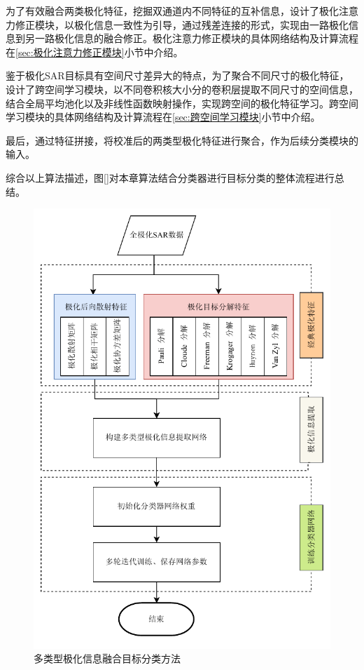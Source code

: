 为了有效融合两类极化特征，挖掘双通道内不同特征的互补信息，设计了极化注意力修正模块，以极化信息一致性为引导，通过残差连接的形式，实现由一路极化信息到另一路极化信息的融合修正。极化注意力修正模块的具体网络结构及计算流程在\ref{sec:极化注意力修正模块}小节中介绍。

鉴于极化SAR目标具有空间尺寸差异大的特点，为了聚合不同尺寸的极化特征，设计了跨空间学习模块，以不同卷积核大小分的卷积层提取不同尺寸的空间信息，结合全局平均池化以及非线性函数映射操作，实现跨空间的极化特征学习。跨空间学习模块的具体网络结构及计算流程在\ref{sec:跨空间学习模块}小节中介绍。

最后，通过特征拼接，将校准后的两类型极化特征进行聚合，作为后续分类模块的输入。

综合以上算法描述，图\ref{}对本章算法结合分类器进行目标分类的整体流程进行总结。
\begin{figure}[ht!]
    \centering
    \includegraphics[width=14cm]{pic/chapter3/DP流程图.pdf}
    \caption{多类型极化信息融合目标分类方法}
    \label{fig:spatial}
\end{figure}



